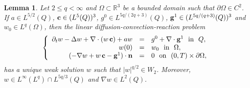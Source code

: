\documentclass[11pt,reqno]{amsart}%
\newtheorem{lemma}[theorem]{Lemma}
\numberwithin{equation}{section}
\begin{document}
{%
% 

 \begin{lemma}\label{lem-B}
 Let 
 $2\le q<\infty$ and 
 $\Omega\subset\mathbb{R}^3$ be a bounded domain such that $\partial\Omega\in C^2$. If 
 $a\in L^{5/2}(Q)$, ${\bf c}\in (L^5(Q))^3$, 
 $g^0\in L^{5q/(2q+3)}(Q)$, 
 ${\bf g}^1\in (L^{5q/(q+3)}(Q))^3$ 
 and 
 $w_0\in L^q(\Omega)$,  then the linear diffusion-convection-reaction problem 
 \begin{equation}\label{lem-B-1}
 \left\{
 \begin{array}{rcl}
 \partial_tw-\Delta w+\nabla\cdot(w\, {\bf c})+aw&=&g^0+\nabla\cdot{\bf g}^1\ \mbox{ in }\ Q,\\
 w(0)&=&w_0\ \mbox{ in }\ \Omega,\\
 (-\nabla w+w\, {\bf c}-{\bf g}^1)\cdot{\bf n}&=&0\ \mbox{ on }\ (0,T)\times\partial\Omega,
 \end{array}
 \right.
 \end{equation}
 has a unique weak solution 
 $w$ such that $|w|^{q/2}\in W_2$. Moreover, 
 $w\in L^\infty(L^q)\cap L^{5q/3}(Q)$ 
  and $\nabla w\in L^2(Q)$. %
  \end{lemma}
 
}
\end{document}
